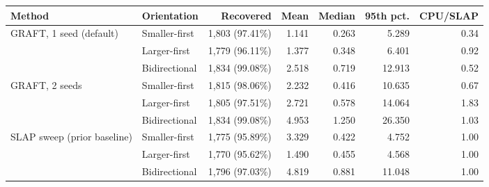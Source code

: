 \begin{tabular}{@{}llrrrrr@{}}\toprule
Method & Orientation & Recovered & Mean & Median & 95th pct. & CPU/SLAP\\\midrule
GRAFT, 1 seed (default) & Smaller-first & 1,803 (97.41\%) & 1.141 & 0.263 & 5.289 & 0.34\\
 & Larger-first & 1,779 (96.11\%) & 1.377 & 0.348 & 6.401 & 0.92\\
 & Bidirectional & 1,834 (99.08\%) & 2.518 & 0.719 & 12.913 & 0.52\\
\midrule
GRAFT, 2 seeds & Smaller-first & 1,815 (98.06\%) & 2.232 & 0.416 & 10.635 & 0.67\\
 & Larger-first & 1,805 (97.51\%) & 2.721 & 0.578 & 14.064 & 1.83\\
 & Bidirectional & 1,834 (99.08\%) & 4.953 & 1.250 & 26.350 & 1.03\\
\midrule
SLAP sweep (prior baseline) & Smaller-first & 1,775 (95.89\%) & 3.329 & 0.422 & 4.752 & 1.00\\
 & Larger-first & 1,770 (95.62\%) & 1.490 & 0.455 & 4.568 & 1.00\\
 & Bidirectional & 1,796 (97.03\%) & 4.819 & 0.881 & 11.048 & 1.00\\
\bottomrule\end{tabular}
